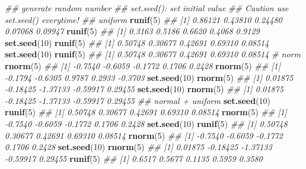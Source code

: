 \documentclass[
]{book}
\newenvironment{Shaded}{\begin{snugshade}}{\end{snugshade}}
\newcommand{\CommentTok}[1]{\textcolor[rgb]{0.56,0.35,0.01}{\textit{#1}}}
\newcommand{\DecValTok}[1]{\textcolor[rgb]{0.00,0.00,0.81}{#1}}
\newcommand{\KeywordTok}[1]{\textcolor[rgb]{0.13,0.29,0.53}{\textbf{#1}}}
\newcommand{\NormalTok}[1]{#1}
\begin{document}
\begin{Shaded}
\begin{Highlighting}[]
\CommentTok{\#\# generate random number}
\CommentTok{\#\# set.seed(): set initial value}
\CommentTok{\#\# Caution use set.seed() everytime!}
\CommentTok{\#\# uniform}
\KeywordTok{runif}\NormalTok{(}\DecValTok{5}\NormalTok{)}
\CommentTok{\#\# [1] 0.86121 0.43810 0.24480 0.07068 0.09947}
\KeywordTok{runif}\NormalTok{(}\DecValTok{5}\NormalTok{)}
\CommentTok{\#\# [1] 0.3163 0.5186 0.6620 0.4068 0.9129}
\KeywordTok{set.seed}\NormalTok{(}\DecValTok{10}\NormalTok{)}
\KeywordTok{runif}\NormalTok{(}\DecValTok{5}\NormalTok{)}
\CommentTok{\#\# [1] 0.50748 0.30677 0.42691 0.69310 0.08514}
\KeywordTok{set.seed}\NormalTok{(}\DecValTok{10}\NormalTok{)}
\KeywordTok{runif}\NormalTok{(}\DecValTok{5}\NormalTok{)}
\CommentTok{\#\# [1] 0.50748 0.30677 0.42691 0.69310 0.08514}
\CommentTok{\# norm}
\KeywordTok{rnorm}\NormalTok{(}\DecValTok{5}\NormalTok{)}
\CommentTok{\#\# [1] {-}0.7540 {-}0.6059 {-}0.1772  0.1706  0.2428}
\KeywordTok{rnorm}\NormalTok{(}\DecValTok{5}\NormalTok{)}
\CommentTok{\#\# [1] {-}0.1794 {-}0.6305  0.9787  0.2933 {-}0.3703}
\KeywordTok{set.seed}\NormalTok{(}\DecValTok{10}\NormalTok{)}
\KeywordTok{rnorm}\NormalTok{(}\DecValTok{5}\NormalTok{)}
\CommentTok{\#\# [1]  0.01875 {-}0.18425 {-}1.37133 {-}0.59917  0.29455}
\KeywordTok{set.seed}\NormalTok{(}\DecValTok{10}\NormalTok{)}
\KeywordTok{rnorm}\NormalTok{(}\DecValTok{5}\NormalTok{)}
\CommentTok{\#\# [1]  0.01875 {-}0.18425 {-}1.37133 {-}0.59917  0.29455}
\CommentTok{\#\#  normal + uniform}
\KeywordTok{set.seed}\NormalTok{(}\DecValTok{10}\NormalTok{)}
\KeywordTok{runif}\NormalTok{(}\DecValTok{5}\NormalTok{)}
\CommentTok{\#\# [1] 0.50748 0.30677 0.42691 0.69310 0.08514}
\KeywordTok{rnorm}\NormalTok{(}\DecValTok{5}\NormalTok{)}
\CommentTok{\#\# [1] {-}0.7540 {-}0.6059 {-}0.1772  0.1706  0.2428}
\KeywordTok{set.seed}\NormalTok{(}\DecValTok{10}\NormalTok{)}
\KeywordTok{runif}\NormalTok{(}\DecValTok{5}\NormalTok{)}
\CommentTok{\#\# [1] 0.50748 0.30677 0.42691 0.69310 0.08514}
\KeywordTok{rnorm}\NormalTok{(}\DecValTok{5}\NormalTok{)}
\CommentTok{\#\# [1] {-}0.7540 {-}0.6059 {-}0.1772  0.1706  0.2428}
\KeywordTok{set.seed}\NormalTok{(}\DecValTok{10}\NormalTok{)}
\KeywordTok{rnorm}\NormalTok{(}\DecValTok{5}\NormalTok{)}
\CommentTok{\#\# [1]  0.01875 {-}0.18425 {-}1.37133 {-}0.59917  0.29455}
\KeywordTok{runif}\NormalTok{(}\DecValTok{5}\NormalTok{)}
\CommentTok{\#\# [1] 0.6517 0.5677 0.1135 0.5959 0.3580}
\end{Highlighting}
\end{Shaded}
\end{document}
